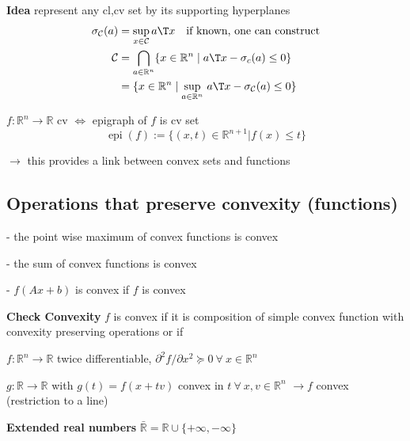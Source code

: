 \textbf{Idea} represent any cl,cv set by its supporting hyperplanes
\[\begin{aligned}
		\vspace{-2mm}
		\sigma_\mathcal{C}(a) & = \sup_{x \in \mathcal{C}}a\T x
		\quad\text{if known, one can construct}                                                                                                        \\
		\vspace{-2mm}
		\mathcal{C}           & = \bigcap_{a \in \mathbb{R}^n} \{x \in \mathbb{R}^n \mid a\T x - \sigma_c(a) \leq 0\}                                  \\
		\vspace{-2mm}
		                      & = \{x \in \mathbb{R}^n \mid \underset{a \in \mathbb{R}^{n}}{\operatorname{sup}}\ a\T x - \sigma_\mathcal{C}(a) \le 0\}
		\vspace{-2mm}
	\end{aligned}\]

\begin{definition}
	$f:\mathbb{R}^n \rightarrow \mathbb{R}$ cv
	$\Leftrightarrow$
	epigraph of $f$ is cv set
	$$\operatorname{epi}(f):=\{(x,t)\in \mathbb{R}^{n+1} | f(x)\le t\}$$
\end{definition}

$\rightarrow$ this provides a link between convex sets and functions

\subsection{Operations that preserve convexity (functions)}

- the point wise maximum of convex functions is convex

- the sum of convex functions is convex

- $f(Ax+b)$ is convex if $f$ is convex

\textbf{Check Convexity} $f$ is convex if it is
composition of simple convex function
with convexity preserving operations
or if

$f: \mathbb{R}^n \rightarrow \mathbb{R}$ twice differentiable,
$\partial^2f/\partial x^2 \succeq 0\ \forall\ x \in \mathbb{R}^{n}$

$g: \mathbb{R} \rightarrow \mathbb{R}$ with $g(t)=f(x+tv)$
convex in $t\ \forall\ x,v \in \mathbb{R}^{n}$
$\rightarrow f$ convex (restriction to a line)

\textbf{Extended real numbers} $\bar{\mathbb{R}} = \mathbb{R} \cup \{+\infty, -\infty\}$

